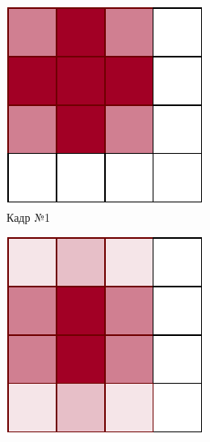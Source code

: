 \begin{figure}[h!]
    \centering
    \begin{subfigure}{0.17\textwidth}
        \centering
        \includegraphics[width=\textwidth]{assets/r1.pdf}
        \caption{Кадр №1}
    \end{subfigure}
    \begin{subfigure}{0.17\textwidth}
        \centering
        \includegraphics[width=\textwidth]{assets/r2.pdf}

\end{subfigure}
\end{figure}
